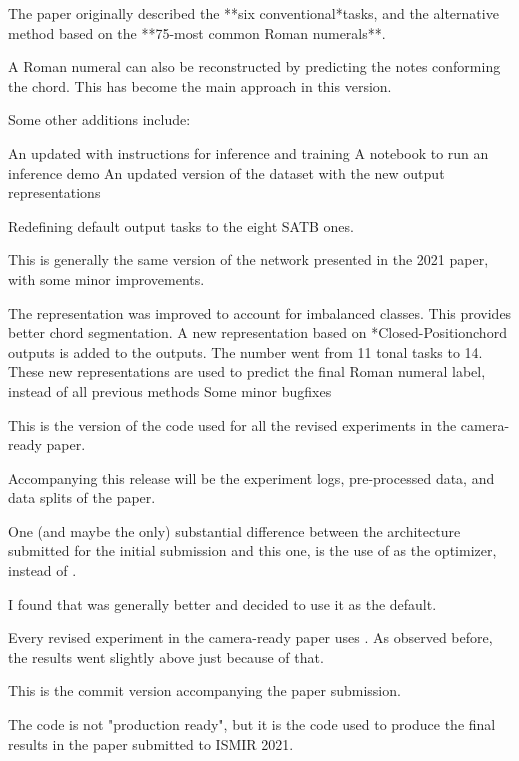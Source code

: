 
The paper originally described the **six conventional*tasks,
and the alternative method based on the **75-most common
Roman numerals**.

A Roman numeral can also be reconstructed by predicting the
notes conforming the chord. This has become the main
approach in this version.

Some other additions include:

An updated  with instructions for inference and
training A notebook to run an inference demo An updated
version of the dataset with the new output representations

Redefining default output tasks to the eight SATB ones.

This is generally the same version of the
 network presented in the 2021 paper,
with some minor improvements.

The  representation was improved to
account for imbalanced classes. This provides better chord
segmentation. A new representation based on
*Closed-Positionchord outputs is added to the outputs. The
number went from 11 tonal tasks to 14. These new
representations are used to predict the final Roman numeral
label, instead of all previous methods Some minor bugfixes

This is the version of the code used for all the revised
experiments in the camera-ready paper.

Accompanying this release will be the experiment logs,
pre-processed data, and data splits of the paper.

One (and maybe the only) substantial difference between the
architecture submitted for the initial submission and this
one, is the use of  as the optimizer, instead
of .

I found that  was generally better and decided
to use it as the default.

Every revised experiment in the camera-ready paper uses
. As observed before, the results went
slightly above just because of that.

This is the commit version accompanying the paper
submission.

The code is not "production ready", but it is the code used
to produce the final results in the paper submitted to ISMIR
2021.

